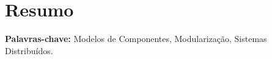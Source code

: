 



%
%
%
%


\chapter*{Resumo}




\noindent \textbf{Palavras-chave:} Modelos de Componentes, Modularização, Sistemas Distribuídos.

%
%

